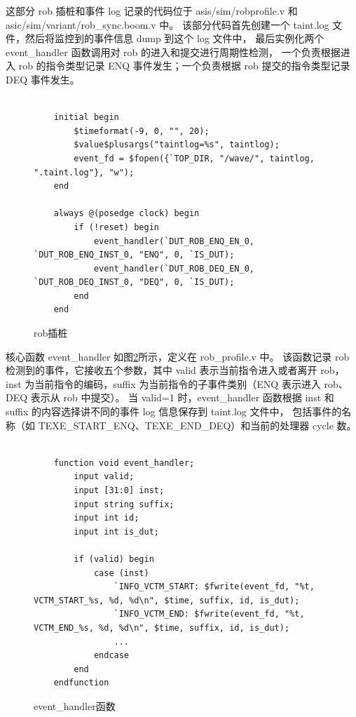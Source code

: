这部分 rob 插桩和事件 log 记录的代码位于 asis/sim/robprofile.v 和 asic/sim/variant/rob\_sync.boom.v 中。
该部分代码首先创建一个 taint.log 文件，然后将监控到的事件信息 dump 到这个 log 文件中，
最后实例化两个 event\_handler 函数调用对 rob 的进入和提交进行周期性检测，
一个负责根据进入 rob 的指令类型记录 ENQ 事件发生；一个负责根据 rob 提交的指令类型记录 DEQ 事件发生。
\begin{figure}[htbp]
    \centering
    \begin{verbatim}

    initial begin
        $timeformat(-9, 0, "", 20);
        $value$plusargs("taintlog=%s", taintlog);
        event_fd = $fopen({`TOP_DIR, "/wave/", taintlog, ".taint.log"}, "w");
    end

    always @(posedge clock) begin
        if (!reset) begin
            event_handler(`DUT_ROB_ENQ_EN_0, `DUT_ROB_ENQ_INST_0, "ENQ", 0, `IS_DUT);
            event_handler(`DUT_ROB_DEQ_EN_0, `DUT_ROB_DEQ_INST_0, "DEQ", 0, `IS_DUT);
        end
    end

    \end{verbatim}
    \caption{rob插桩}
    \label{code:rob-stub}
\end{figure}

核心函数 event\_handler 如图\ref{code:event-handler}所示，定义在 rob\_profile.v 中。
该函数记录 rob 检测到的事件，它接收五个参数，其中 valid 表示当前指令进入或者离开 rob，
inst 为当前指令的编码，suffix 为当前指令的子事件类别（ENQ 表示进入 rob、DEQ 表示从 rob 中提交）。
当 valid=1 时，event\_handler 函数根据 inst 和 suffix 的内容选择讲不同的事件 log 信息保存到 taint.log 文件中，
包括事件的名称（如 TEXE\_START\_ENQ、TEXE\_END\_DEQ）和当前的处理器 cycle 数。

\begin{figure}[htbp]
    \centering
    \begin{verbatim}

    function void event_handler;
        input valid;
        input [31:0] inst;
        input string suffix;
        input int id;
        input int is_dut;

        if (valid) begin
            case (inst)
                `INFO_VCTM_START: $fwrite(event_fd, "%t, VCTM_START_%s, %d, %d\n", $time, suffix, id, is_dut);
                `INFO_VCTM_END: $fwrite(event_fd, "%t, VCTM_END_%s, %d, %d\n", $time, suffix, id, is_dut);
                ...
            endcase
        end
    endfunction
    \end{verbatim}
    \caption{event\_handler函数}
    \label{code:event-handler}
\end{figure}


